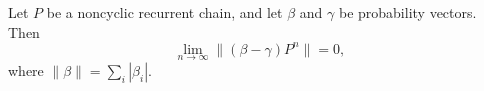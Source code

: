 Let $P$ be a noncyclic recurrent chain, and let $\beta$ and $\gamma$ be probability vectors. Then
$$\lim_{n \to \infty} \|(\beta - \gamma)P^n\| = 0,$$
where $\|\beta\| = \sum_i |\beta_i|$.
